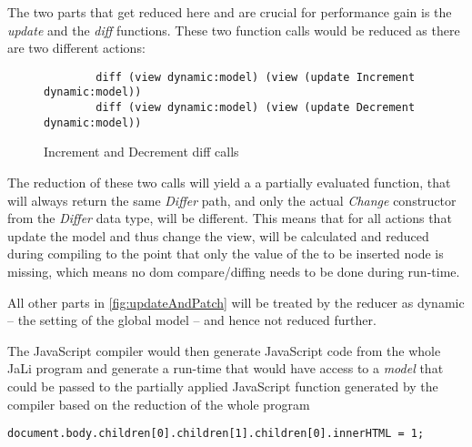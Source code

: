 The two parts that get reduced here and are crucial for performance gain is the \textit{update} and the \textit{diff} functions.
These two function calls would be reduced as there are two different actions:

\begin{figure}[H]
    \centering
    \begin{verbatim}
        diff (view dynamic:model) (view (update Increment dynamic:model))
        diff (view dynamic:model) (view (update Decrement dynamic:model))
    \end{verbatim}
    \caption{Increment and Decrement diff calls}
    \label{fig:diff-inc-dec}
\end{figure}

The reduction of these two calls will yield a a partially evaluated function, that will always return the same \textit{Differ} path, and only the actual \textit{Change} constructor from the \textit{Differ} data type, will be different.
This means that for all actions that update the model and thus change the view, will be calculated and reduced during compiling to the point that only the value of the to be inserted node is missing, which means no \gls{dom} compare/diffing needs to be done during run-time.

All other parts in \ref{fig:updateAndPatch} will be treated by the reducer as dynamic -- the setting of the global model -- and hence not reduced further.




The JavaScript compiler would then generate JavaScript code from the whole JaLi program and generate a run-time that would have access to a \textit{model} that could be passed to the partially applied JavaScript function generated by the compiler based on the reduction of the whole program



\begin{verbatim}
document.body.children[0].children[1].children[0].innerHTML = 1;
\end{verbatim}



